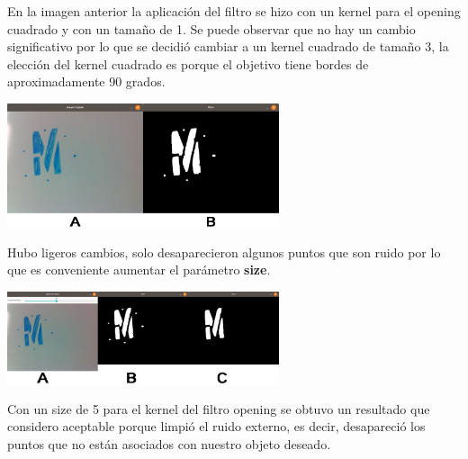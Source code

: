 En la imagen anterior la aplicación del filtro se hizo con un kernel para el opening cuadrado y con un tamaño de 1.
Se puede observar que no hay un cambio significativo por lo que se decidió cambiar a un kernel cuadrado
de tamaño 3, la elección del kernel cuadrado es porque el objetivo tiene bordes de aproximadamente 90
grados.
\begin{center}
	\includegraphics[width=0.6\textwidth]{Contenido/Cuerpo/Capitulo4/Fig17.eps}
	\label{Fig9}
\end{center}
Hubo ligeros cambios, solo desaparecieron algunos puntos que son ruido por lo que es conveniente aumentar
el parámetro \textbf{size}.
\begin{center}
	\includegraphics[width=0.6\textwidth]{Contenido/Cuerpo/Capitulo4/Fig15.eps}
	\label{Fig9}
\end{center}
Con un size de 5 para el kernel del filtro opening se obtuvo un resultado que considero aceptable porque
limpió el ruido externo, es decir, desapareció los puntos que no están asociados con nuestro objeto deseado.


